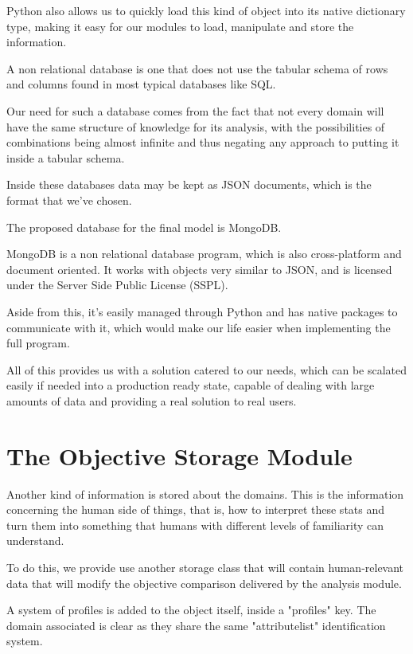 Python also allows us to quickly load this kind of object into its native dictionary type, making it easy for our modules to load, manipulate and store the information.

A non relational database is one that does not use the tabular schema of rows and columns found in most typical databases like SQL.

Our need for such a database comes from the fact that not every domain will have the same structure of knowledge for its analysis, with the possibilities of combinations being almost infinite and thus negating any approach to putting it inside a tabular schema.

Inside these databases data may be kept as JSON documents, which is the format that we've chosen.

The proposed database for the final model is MongoDB. 

MongoDB is a non relational database program, which is also cross-platform and document oriented. It works with objects very similar to JSON, and is licensed under the Server Side Public License (SSPL). 

Aside from this, it's easily managed through Python and has native packages to communicate with it, which would make our life easier when implementing the full program.

All of this provides us with a solution catered to our needs, which can be scalated easily if needed into a production ready state, capable of dealing with large amounts of data and providing a real solution to real users.

\section{The Objective Storage Module}
\label{cap2:sec:profilejson}

Another kind of information is stored about the domains. This is the information concerning the human side of things, that is, how to interpret these stats and turn them into something that humans with different levels of familiarity can understand.

To do this, we provide use another storage class that will contain human-relevant data that will modify the objective comparison delivered by the analysis module.

A system of profiles is added to the object itself, inside a "profiles" key. The domain associated is clear as they share the same "attributelist" identification system.

